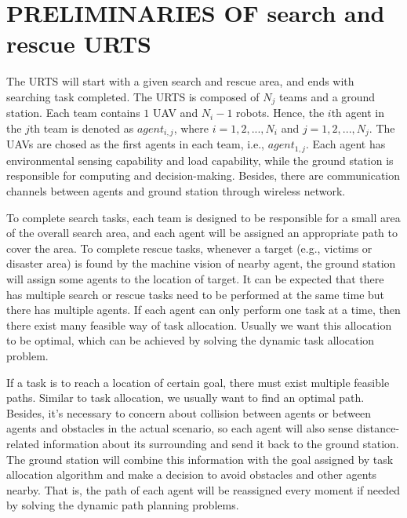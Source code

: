 \documentclass{ieeeaccess}
\begin{document}
\section{PRELIMINARIES OF search and rescue URTS}
The URTS will start with a given search and rescue area, and ends with searching task completed. The URTS is composed of $N_j$ teams and a ground station. Each team contains $1$ UAV and $N_i-1$ robots. Hence, the $i$th agent in the $j$th team is denoted as $agent_{i,j}$, where $i=1,2,...,N_i$ and $j=1,2,...,N_j$. The UAVs are chosed as the first agents in each team, i.e., $agent_{1,j}$. Each agent has environmental sensing capability and load capability, while the ground station is responsible for computing and decision-making. Besides, there are communication channels between agents and ground station through wireless network.

To complete search tasks, each team is designed to be responsible for a small area of the overall search area, and each agent will be assigned an appropriate path to cover the area. To complete rescue tasks, whenever a target (e.g., victims or disaster area) is found by the machine vision of nearby agent, the ground station will assign some agents to the location of target. It can be expected that there has multiple search or rescue tasks need to be performed at the same time but there has multiple agents. If each agent can only perform one task at a time, then there exist many feasible way of task allocation. Usually we want this allocation to be optimal, which can be achieved by solving the dynamic task allocation problem.

If a task is to reach a location of certain goal, there must exist multiple feasible paths. Similar to task allocation, we usually want to find an optimal path. Besides, it's necessary to concern about collision between agents or between agents and obstacles in the actual scenario, so each agent will also sense distance-related information about its surrounding and send it back to the ground station. The ground station will combine this information with the goal assigned by task allocation algorithm and make a decision to avoid obstacles and other agents nearby. That is, the path of each agent will be reassigned every moment if needed by solving the dynamic path planning problems.
\end{document}
